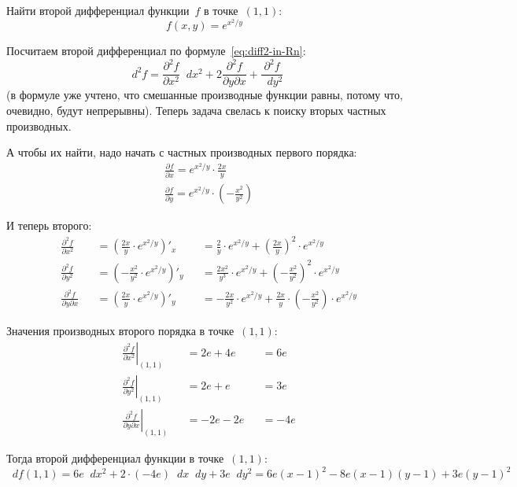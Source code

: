 \documentclass[a4paper,12pt]{article}
\newcommand{\diff}{\mathop{}\!d}
\begin{document}
  Найти второй дифференциал функции~$f$ в точке~$(1, 1)$:
  \[
    f(x, y) = e^{x^2 / y}
  \]
  
  \begin{solution}
    Посчитаем второй дифференциал по формуле~\eqref{eq:diff2-in-Rn}:
    \[
      \diff^2 f = \frac{\partial^2 f}{\partial x^2} \diff x^2 + 2 \frac{\partial^2 f}{\partial y \partial x} + \frac{\partial^2 f}{\diff y^2}
    \]
    (в формуле уже учтено, что смешанные производные функции равны, потому что, очевидно, будут непрерывны).
    Теперь задача свелась к поиску вторых частных производных.
    
    А чтобы их найти, надо начать с частных производных первого порядка:
    \[
      \begin{aligned}
        &\frac{\partial f}{\partial x} = e^{x^2 / y} \cdot \frac{2x}{y}\\
        &\frac{\partial f}{\partial y} = e^{x^2 / y} \cdot \left(-\frac{x^2}{y^2}\right)
      \end{aligned}
    \]

    И теперь второго:
    \[
      \begin{alignedat}{3}
        &\frac{\partial^2 f}{\partial x^2} & &= \left(\frac{2x}{y} \cdot e^{x^2 / y}\right)'_x & &= \frac{2}{y} \cdot e^{x^2 / y} + \left(\frac{2x}{y}\right)^2 \cdot e^{x^2 / y}\\
        &\frac{\partial^2 f}{\partial y^2} & &= \left(-\frac{x^2}{y^2} \cdot e^{x^2 / y}\right)'_y & &= \frac{2x^2}{y^3} \cdot e^{x^2 / y} + \left(-\frac{x^2}{y^2}\right)^2 \cdot e^{x^2 / y}\\
        &\frac{\partial^2 f}{\partial y \partial x} & &= \left(\frac{2x}{y} \cdot e^{x^2 / y}\right)'_y & &= -\frac{2x}{y^2} \cdot e^{x^2 / y} + \frac{2x}{y} \cdot \left(-\frac{x^2}{y^2}\right) \cdot e^{x^2 / y}
      \end{alignedat}
    \]

    Значения производных второго порядка в точке~$(1, 1)$:
    \[
      \begin{alignedat}{3}
        &\left.\frac{\partial^2 f}{\partial x^2}\right|_{(1, 1)} & &= 2e + 4e & &= 6e\\
        &\left.\frac{\partial^2 f}{\partial y^2}\right|_{(1, 1)} & &= 2e + e & &= 3e\\
        &\left.\frac{\partial^2 f}{\partial y \partial x}\right|_{(1, 1)} & &= -2e - 2e & &= -4e
      \end{alignedat}
    \]

    Тогда второй дифференциал функции в точке~$(1, 1)$:
    \[
      \diff f(1, 1) = 6e \diff x^2 + 2 \cdot (-4e) \diff x \diff y + 3e \diff y^2
      = 6e(x - 1)^2 - 8e(x - 1)(y - 1) + 3e(y - 1)^2
    \]
  \end{solution}
\end{document}
